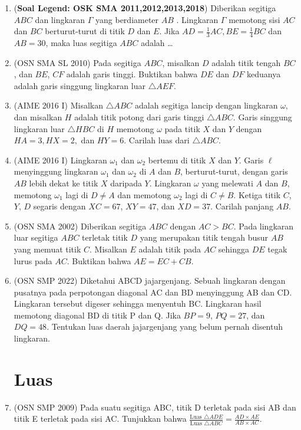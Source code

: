 \documentclass[12pt]{article}
\begin{document}
\begin{CJK*}{UTF8}{min}
\begin{enumerate}
    \item (\textbf{Soal Legend: OSK SMA 2011,2012,2013,2018}) Diberikan segitiga $ABC$ dan lingkaran $\Gamma$ yang berdiameter $AB$ . Lingkaran $\Gamma$ memotong sisi $AC$ dan $BC$ berturut-turut di titik $D$ dan $E$. Jika $AD = \frac13 AC, BE =\frac14 BC$ dan $AB = 30$, maka luas segitiga $ABC$ adalah \dots

    \item (OSN SMA SL 2010) Pada segitiga $ABC$, misalkan $D$ adalah titik tengah $BC$, dan $BE$, $CF$ adalah garis tinggi. Buktikan bahwa $DE$ dan $DF$ keduanya adalah garis singgung lingkaran luar $\triangle AEF$. %

    \item (AIME 2016 I) Misalkan $\triangle ABC$ adalah segitiga lancip dengan lingkaran $\omega,$ dan misalkan $H$ adalah titik potong dari garis tinggi $\triangle ABC.$ Garis singgung lingkaran luar $\triangle HBC$ di $H$ memotong $\omega$ pada titik $X$ dan $Y$ dengan $HA=3,HX=2,$ dan $HY=6.$ Carilah luas dari $\triangle ABC$.

    \item (AIME 2016 I) Lingkaran $\omega_1$ dan $\omega_2$ bertemu di titik $X$ dan $Y$. Garis $\ell$ menyinggung lingkaran $\omega_1$ dan $\omega_2$ di $A$ dan $B$, berturut-turut, dengan garis $AB$ lebih dekat ke titik $X$ daripada $Y$. Lingkaran $\omega$ yang melewati $A$ dan $B$, memotong $\omega_1$ lagi di $D \neq A$ dan memotong $\omega_2$ lagi di $C \neq B$. Ketiga titik $C$, $Y$, $D$ segaris dengan $XC = 67$, $XY = 47$, dan $XD = 37$. Carilah panjang $AB$.


    \item (OSN SMA 2002)
    Diberikan segitiga $ABC$ dengan $AC > BC$. Pada lingkaran luar segitiga $ABC$ terletak titik $D$ yang merupakan titik tengah busur $AB$ yang memuat titik $C$. Misalkan $E$ adalah titik pada $AC$ sehingga $DE$ tegak lurus pada $AC$. Buktikan bahwa $AE = EC + CB$.

    \item (OSN SMP 2022) Diketahui ABCD jajargenjang. Sebuah lingkaran dengan pusatnya pada perpotongan diagonal AC dan BD menyinggung AB dan CD. Lingkaran tersebut digeser sehingga menyentuh BC. Lingkaran hasil memotong diagonal BD di titik P dan Q. Jika $BP=9$, $PQ=27$, dan $DQ=48$. Tentukan luas daerah jajargenjang yang belum pernah disentuh lingkaran.

\section{Luas}
    \item (OSN SMP 2009) Pada suatu segitiga ABC, titik D terletak pada sisi AB dan titik E terletak pada sisi AC. Tunjukkan bahwa $\frac{\text{Luas } \triangle ADE}{\text{Luas } \triangle ABC} = \frac{AD \times AE}{AB \times AC}$.


\end{enumerate}
\end{CJK*}
\end{document}
